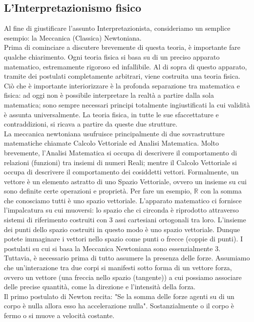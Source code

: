 \documentclass[]{article}
\begin{document}
	\subsection{L'Interpretazionismo fisico}
	Al fine di giustificare l'assunto Interpretazionista, consideriamo un semplice esempio: la Meccanica (Classica) Newtoniana.\\
	Prima di cominciare a discutere brevemente di questa teoria, è importante fare qualche chiarimento. Ogni teoria fisica si basa su di un preciso apparato matematico, estremamente rigoroso ed infallibile. Al di sopra di questo apparato, tramite dei postulati completamente arbitrari, viene costruita una teoria fisica. Ciò che è importante interiorizzare è la profonda separazione tra matematica e fisica: ad oggi non è possibile interpretare la realtà a partire dalla sola matematica; sono sempre necessari principi totalmente ingiustificati la cui validità è assunta universalmente. La teoria fisica, in tutte le sue sfaccettature e contraddizioni, si ricava a partire da queste due strutture.\\
	La meccanica newtoniana usufruisce principalmente di due sovrastrutture matematiche chiamate Calcolo Vettoriale ed Analisi Matematica. Molto brevemente, l'Analisi Matematica si occupa di descrivere il comportamento di relazioni (funzioni) tra insiemi di numeri Reali; mentre il Calcolo Vettoriale si occupa di descrivere il comportamento dei cosiddetti vettori. Formalmente, un vettore è un elemento astratto di uno Spazio Vettoriale, ovvero un insieme su cui sono definite certe operazioni e proprietà. Per fare un esempio, $\mathbb{R}$ con la somma che conosciamo tutti è uno spazio vettoriale. L'apparato matematico ci fornisce l'impalcatura su cui muoversi: lo spazio che ci circonda è riprodotto attraverso sistemi di riferimento costruiti con 3 assi cartesiani ortogonali tra loro. L'insieme dei punti dello spazio costruiti in questo modo è uno spazio vettoriale. Dunque potete immaginare i vettori nello spazio come punti o frecce (coppie di punti). I postulati su cui si basa la Meccanica Newtoniana sono essenzialmente 3. Tuttavia, è necessario prima di tutto assumere la presenza delle forze. Assumiamo che un'interazione tra due corpi si manifesti sotto forma di un vettore forza, ovvero un vettore (una freccia nello spazio (tangente)) a cui possiamo associare delle precise quantità, come la direzione e l'intensità della forza.\\
	Il primo postulato di Newton recita: "Se la somma delle forze agenti su di un corpo è nulla allora esso ha accelerazione nulla". Sostanzialmente o il corpo è fermo o si muove a velocità costante. \\
\end{document}
